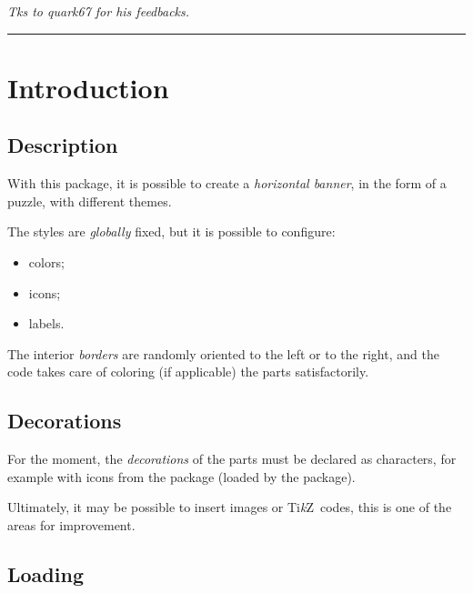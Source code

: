 \documentclass[11pt,a4paper]{ltxdoc}
\providecommand\tikzlogo{Ti\textit{k}Z}
\let\TikZ\tikzlogo
\begin{document}
\hfill{\footnotesize\itshape Tks to quark67 for his feedbacks.}

\pagebreak


\hypertarget{matoc}{}

\tableofcontents

\vspace*{5mm}

\hrule

\vspace*{5mm}

\section{Introduction}

\subsection{Description}

With this package, it is possible to create a \textit{horizontal banner}, in the form of a puzzle, with different themes.

The styles are \textit{globally} fixed, but it is possible to configure:

\begin{itemize}
	\item colors;
	\item icons;
	\item labels.
\end{itemize}

The interior \textit{borders} are randomly oriented to the left or to the right, and the code takes care of coloring (if applicable) the parts satisfactorily.

\subsection{Decorations}

For the moment, the \textit{decorations} of the parts must be declared as characters, for example with icons from the  package (loaded by the package).

\smallskip

Ultimately, it may be possible to insert images or \TikZ\ codes, this is one of the areas for improvement.

\subsection{Loading}
\end{document}
